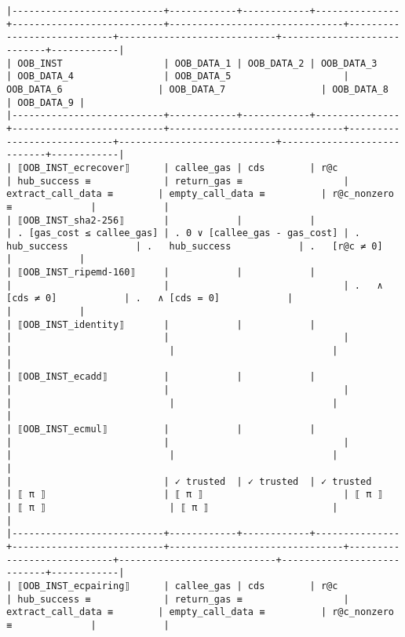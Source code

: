 \documentclass[varwidth=\maxdimen,margin=0.5cm,multi={verbatim}]{standalone}
\begin{document}
\begin{verbatim}
|---------------------------+------------+------------+---------------+---------------------------+-------------------------------+----------------------------+----------------------------+----------------------------+------------|
| OOB_INST                  | OOB_DATA_1 | OOB_DATA_2 | OOB_DATA_3    | OOB_DATA_4                | OOB_DATA_5                    | OOB_DATA_6                 | OOB_DATA_7                 | OOB_DATA_8                 | OOB_DATA_9 |
|---------------------------+------------+------------+---------------+---------------------------+-------------------------------+----------------------------+----------------------------+----------------------------+------------|
| ⟦OOB_INST_ecrecover⟧      | callee_gas | cds        | r@c           | hub_success ≡             | return_gas ≡                  | extract_call_data ≡        | empty_call_data ≡          | r@c_nonzero ≡              |            |
| ⟦OOB_INST_sha2-256⟧       |            |            |               | . [gas_cost ≤ callee_gas] | . 0 ∨ [callee_gas - gas_cost] | .   hub_success            | .   hub_success            | .   [r@c ≠ 0]              |            |
| ⟦OOB_INST_ripemd-160⟧     |            |            |               |                           |                               | .   ∧ [cds ≠ 0]            | .   ∧ [cds = 0]            |                            |            |
| ⟦OOB_INST_identity⟧       |            |            |               |                           |                               |                            |                            |                            |            |
| ⟦OOB_INST_ecadd⟧          |            |            |               |                           |                               |                            |                            |                            |            |
| ⟦OOB_INST_ecmul⟧          |            |            |               |                           |                               |                            |                            |                            |            |
|                           | ✓ trusted  | ✓ trusted  | ✓ trusted     | ⟦ π ⟧                     | ⟦ π ⟧                         | ⟦ π ⟧                      | ⟦ π ⟧                      | ⟦ π ⟧                      |            |
|---------------------------+------------+------------+---------------+---------------------------+-------------------------------+----------------------------+----------------------------+----------------------------+------------|
| ⟦OOB_INST_ecpairing⟧      | callee_gas | cds        | r@c           | hub_success ≡             | return_gas ≡                  | extract_call_data ≡        | empty_call_data ≡          | r@c_nonzero ≡              |            |

\end{verbatim}
\end{document}
